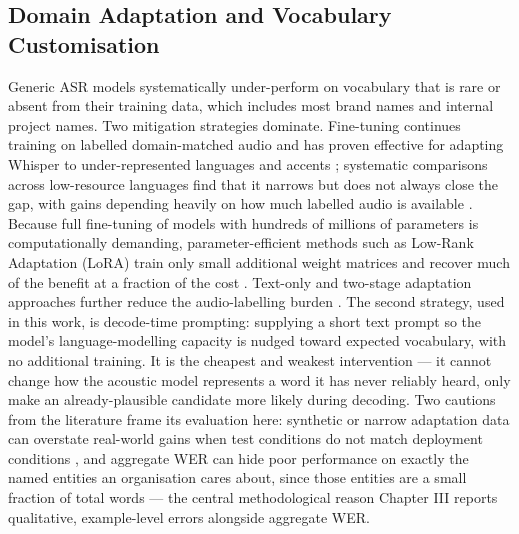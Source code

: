 \documentclass[12pt]{report}
\begin{document}
\subsection{Domain Adaptation and Vocabulary Customisation}
Generic ASR models systematically under-perform on vocabulary that is rare or absent from their training data, which includes most brand names and internal project names. Two mitigation strategies dominate. Fine-tuning continues training on labelled domain-matched audio and has proven effective for adapting Whisper to under-represented languages and accents \cite{daouad2024optimizing,polat2024implementation}; systematic comparisons across low-resource languages find that it narrows but does not always close the gap, with gains depending heavily on how much labelled audio is available \cite{whisperfinetune2024}. Because full fine-tuning of models with hundreds of millions of parameters is computationally demanding, parameter-efficient methods such as Low-Rank Adaptation (LoRA) train only small additional weight matrices and recover much of the benefit at a fraction of the cost \cite{ankita2026exploring}. Text-only and two-stage adaptation approaches further reduce the audio-labelling burden \cite{fang2025textonly,zheng2026twostage}. The second strategy, used in this work, is decode-time prompting: supplying a short text prompt so the model's language-modelling capacity is nudged toward expected vocabulary, with no additional training. It is the cheapest and weakest intervention --- it cannot change how the acoustic model represents a word it has never reliably heard, only make an already-plausible candidate more likely during decoding. Two cautions from the literature frame its evaluation here: synthetic or narrow adaptation data can overstate real-world gains when test conditions do not match deployment conditions \cite{tran2025das}, and aggregate WER can hide poor performance on exactly the named entities an organisation cares about, since those entities are a small fraction of total words \cite{durmus2026contextual} --- the central methodological reason Chapter III reports qualitative, example-level errors alongside aggregate WER.
\end{document}
